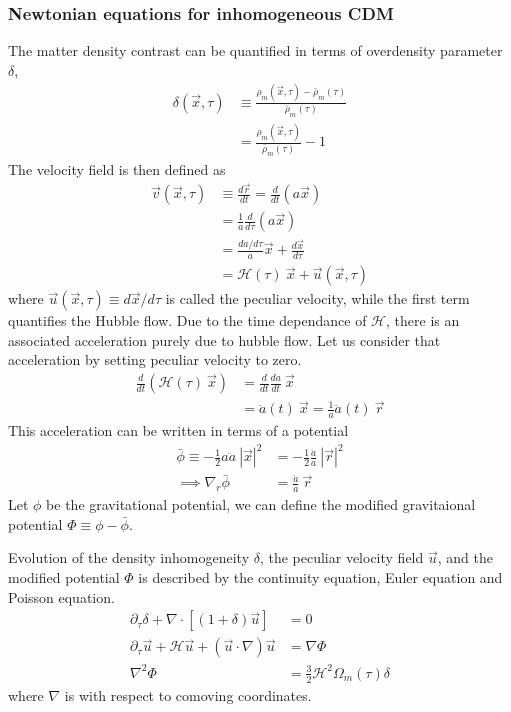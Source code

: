 \documentclass[12pt,twocolumn]{article}
\begin{document}
\subsubsection{Newtonian equations for inhomogeneous CDM}
The matter density contrast can be quantified in terms of overdensity parameter $\delta$,
\begin{align}
\nonumber
\delta (\vec{x}, \tau) &\equiv \frac{{\rho}_{m} (\vec{x}, \tau) -\bar{\rho}_{m} (\tau) }{\bar{\rho}_{m} (\tau)} \\
&= \frac{{\rho}_{m} (\vec{x}, \tau) }{\bar{\rho}_{m} (\tau)} - 1
\end{align}
The velocity field is then defined as
\begin{align}
\vec{v} (\vec{x}, \tau) &\equiv \frac{d \vec{r}}{dt} = \frac{d }{dt} (a \vec{x})\\
&= \frac{1}{a} \frac{d }{d \tau} (a \vec{x})\\
&= \frac{da/d \tau}{a} \vec{x} + \frac{d \vec{x}}{d \tau}\\
&= \mathcal{H} (\tau) ~\vec{x} + \vec{u} (\vec{x}, \tau)
\end{align}
where $\vec{u} (\vec{x}, \tau) \equiv d \vec{x} / d\tau$ is called the peculiar velocity, while the first term quantifies the Hubble flow. Due to the time dependance of $\mathcal{H}$, there is an associated acceleration purely due to hubble flow. Let us consider that acceleration by setting peculiar velocity to zero. 
\begin{align}
\frac{d}{dt} \left( \mathcal{H} (\tau) ~\vec{x} \right) &= \frac{d}{dt} \frac{da}{dt}  ~\vec{x}\\
&= \ddot{a}(t) ~\vec{x} = \frac{1}{a} \ddot{a}(t) ~\vec{r}
\end{align}
This acceleration can be written in terms of a potential
\begin{align}
\bar{\phi} \equiv - \frac{1}{2} a \ddot{a} ~\left| \vec{x}\right| ^2 &= - \frac{1}{2} \frac{\ddot{a}}{a} ~\left| \vec{r}\right| ^2\\
\implies \nabla_{r} \bar{\phi} &= \frac{\ddot{a}}{a} ~\vec{r}
\end{align}
Let $\phi$ be the gravitational potential, we can define the modified gravitaional potential $\Phi \equiv \phi - \bar{\phi}$.

Evolution of the density inhomogeneity $\delta$, the peculiar velocity field  $\vec{u}$, and the modified potential $\Phi$ is described by the continuity equation, Euler equation and Poisson equation.
\begin{align}
\partial_{\tau} \delta + \nabla \cdot \left[ (1+ \delta) \vec{u} \right] &= 0\\
\partial_{\tau} \vec{u} + \mathcal{H} \vec{u} + \left( \vec{u} \cdot \nabla \right)  \vec{u} &= \nabla \Phi\\
\nabla^2 \Phi &= \frac{3}{2} \mathcal{H}^2 \Omega_{m}(\tau) \delta
\end{align}
where $\nabla$ is with respect to comoving coordinates.
\end{document}
